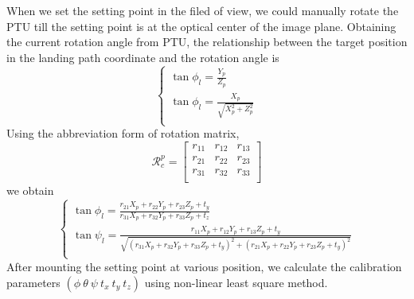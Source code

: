 \documentclass[journal,article,submit,moreauthors,pdftex,10pt,a4paper]{mdpi}
\begin{document}
When we set the setting point in the filed of view, we could manually rotate the PTU till the setting point is at the optical center of the image plane. Obtaining the current rotation angle from PTU, the relationship between the target position in the landing path coordinate and the rotation angle is
\begin{equation}
\left\{ \begin{gathered}
\tan \phi_l = \frac{Y_p}{Z_p} \\
\tan \phi_l = \frac{X_p}{\sqrt{X_p^2+Z_p^2} }\\
\end{gathered}  \right.
\end{equation}
Using the abbreviation form of rotation matrix, 
\begin{equation}
\mathcal{R}_c^p = \begin{bmatrix}
r_{11} & r_{12} & r_{13}\\
r_{21} & r_{22} & r_{23}\\
r_{31} & r_{32} & r_{33}\\
\end{bmatrix}
\end{equation}
we obtain
\begin{equation}
\left\{ \begin{gathered}
\tan \phi_l= \frac{r_{21}X_p + r_{22}Y_p + r_{23}Z_p + t_y}{r_{31}X_p + r_{32}Y_p + r_{33}Z_p + t_z} \\
\tan \psi_l= \frac{r_{11}X_p + r_{12}Y_p + r_{13}Z_p + t_y}{\sqrt{(r_{31}X_p + r_{32}Y_p + r_{33}Z_p + t_y)^2+(r_{21}X_p + r_{22}Y_p + r_{23}Z_p + t_y)^2} }\\
\end{gathered}  \right.
\end{equation}
After mounting the setting point at various position, we calculate the calibration parameters $(\phi\ \theta\ \psi\ t_x\ t_y\ t_z)$ using non-linear least square method.
\end{document}
